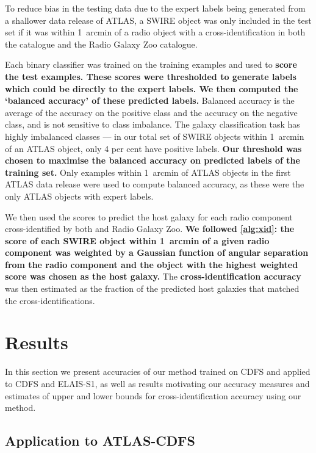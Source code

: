 \documentclass[fleqn,usenatbib,usedcolumn]{mnras}
\newcommand{\edited}[1]{{\bf {#1}}}
\begin{document}
    To reduce bias in the testing data due to the expert labels being
    generated from a shallower data release of ATLAS, a SWIRE object was only
    included in the test set if it was within 1~arcmin of a radio object with
    a cross-identification in both the \citet{norris06} catalogue and the
    Radio Galaxy Zoo catalogue.

    Each binary classifier was trained on the training examples and used to
    \edited{score the test examples. These scores were thresholded to generate labels which could be directly
    to the expert labels. We then computed the `balanced accuracy' of these predicted labels.} Balanced
    accuracy is the average of the accuracy on the positive class and the
    accuracy on the negative class, and is not sensitive to class imbalance.
    The galaxy classification task has highly imbalanced classes --- in our
    total set of SWIRE objects within 1~arcmin of an ATLAS object, only 4 per
    cent have positive labels. \edited{Our threshold was chosen to maximise the balanced
    accuracy on predicted labels of the training set.} Only examples within 1~arcmin of ATLAS objects
    in the first ATLAS data release \citep{norris06} were used to compute
    balanced accuracy, as these were the only ATLAS objects with expert labels.

    We then used the scores to predict the host galaxy
    for each radio component cross-identified by both \citet{norris06} and
    Radio Galaxy Zoo. \edited{We followed \autoref{alg:xid}:
    the score of each SWIRE object within 1~arcmin of a given radio
    component was weighted by a Gaussian function of angular separation from the
    radio component and the object with the highest
    weighted score was chosen as the host galaxy.} The
    \edited{cross-identification accuracy} was then estimated as the
    fraction of the predicted host galaxies that matched the \citet{norris06}
    cross-identifications.

\section{Results}\label{sec:results}

  In this section we present accuracies of our method trained on CDFS and
  applied to CDFS and ELAIS-S1, as well as results motivating our accuracy
  measures and estimates of upper and lower bounds for cross-identification
  accuracy using our method.

  \subsection{Application to ATLAS-CDFS}
  \label{sec:cdfs-results}
\end{document}
